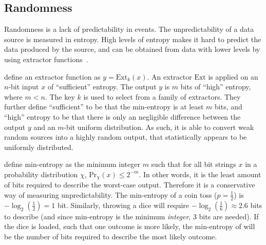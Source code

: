 \subsection{Randomness}\label{sub:prelims_randomness}

Randomness is a lack of predictability in events.
The unpredictability of a data source is measured in entropy.
High levels of entropy makes it hard to predict the data produced by the source, and can be obtained from data with lower levels by using extractor functions~\cite{pseudorandomness}.

\citet{bonneau2015bitcoin} define an extractor function as $y = \text{Ext}_k(x)$.
An extractor $\text{Ext}$ is applied on an $n$-bit input $x$ of \enquote{sufficient} entropy.
The output $y$ is $m$ bits of \enquote{high} entropy, where $m < n$. The key $k$ is used to select from a family of extractors.
They further define \enquote{sufficient} to be that the min-entropy is at least $m$ bits, and \enquote{high} entropy to be that there is only an negligible difference between the output $y$ and an $m$-bit uniform distribution.
As such, it is able to convert weak random sources into a highly random output, that statistically appears to be uniformly distributed.


\citet{dodis2004randomness} define min-entropy as the minimum integer $m$ such that for all bit strings $x$ in a probability distribution $\chi$, $\text{Pr}_\chi(x) \leq 2^{-m}$.
In other words, it is the least amount of bits required to describe the worst-case output.
Therefore it is a conservative way of measuring unpredictability.
The min-entropy of a coin toss ($p = \frac{1}{2}$) is $-\log_2(\frac{1}{2}) = 1$ bit. Similarly, throwing a dice will require $-\log_2(\frac{1}{6}) \approx 2.6$ bits to describe (and since min-entropy is the minimum \emph{integer}, 3 bits are needed).
If the dice is loaded, such that one outcome is more likely, the min-entropy of will be the number of bits required to describe the most likely outcome.

